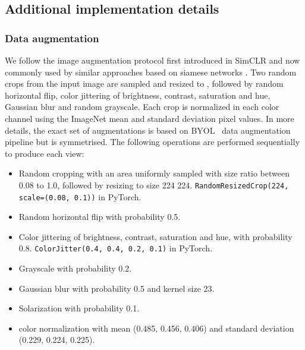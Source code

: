 \documentclass{article}
\begin{document}
\clearpage



















\subsection{Additional implementation details} \label{app:sec_impl_details}

\subsubsection{Data augmentation} \label{app:data_aug}

We follow the image augmentation protocol first introduced in SimCLR \cite{chen2020simclr} and now commonly used by similar approaches based on siamese networks \cite{caron2020swav, grill2020byol, chen2020simsiam, zbontar2021barlow}. Two random crops from the input image are sampled and resized to , followed by random horizontal flip, color jittering of brightness, contrast, saturation and hue, Gaussian blur and random grayscale. Each crop is normalized in each color channel using the ImageNet mean and standard deviation pixel values.
In more details, the exact set of augmentations is based on BYOL~\cite{grill2020byol} data augmentation pipeline but is symmetrised. The following operations are performed sequentially to produce each view:
\begin{itemize}
    \item Random cropping with an area uniformly sampled with size ratio between 0.08 to 1.0, followed by resizing to size 224  224. \texttt{RandomResizedCrop(224, scale=(0.08, 0.1))} in PyTorch.
    \item Random horizontal flip with probability 0.5.
    \item Color jittering of brightness, contrast, saturation and hue, with probability 0.8. \texttt{ColorJitter(0.4, 0.4, 0.2, 0.1)} in PyTorch.
    \item Grayscale with probability 0.2.
    \item Gaussian blur with probability 0.5 and kernel size 23.
    \item Solarization with probability 0.1.
    \item color normalization with mean (0.485, 0.456, 0.406) and standard deviation (0.229, 0.224, 0.225).
\end{itemize}
\end{document}
